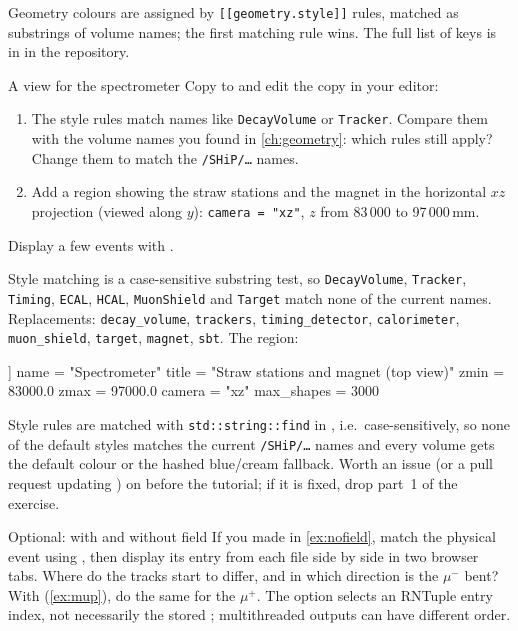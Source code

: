 Geometry colours are assigned by \texttt{[[geometry.style]]} rules, matched
as substrings of volume names; the first matching rule wins. The full list of
keys is in  in the repository.

\begin{exercise}{A view for the spectrometer}
Copy  to  and edit the copy
in your editor:
\begin{enumerate}
  \item The style rules match names like \texttt{DecayVolume} or
        \texttt{Tracker}. Compare them with the volume names you found in
        \cref{ch:geometry}: which rules still apply? Change them to match the
        \texttt{/SHiP/\ldots} names.
  \item Add a region showing the straw stations and the magnet in the
        horizontal $xz$ projection (viewed along $y$): \texttt{camera = "xz"},
        $z$ from 83\,000 to 97\,000\,mm.
\end{enumerate}
Display a few events with .
\end{exercise}

\begin{solution}
Style matching is a case-sensitive substring test, so
\texttt{DecayVolume}, \texttt{Tracker}, \texttt{Timing}, \texttt{ECAL},
\texttt{HCAL}, \texttt{MuonShield} and \texttt{Target} match none of the
current names. Replacements: \texttt{decay\_volume}, \texttt{trackers},
\texttt{timing\_detector}, \texttt{calorimeter}, \texttt{muon\_shield},
\texttt{target}, \texttt{magnet}, \texttt{sbt}. The region:
\begin{tomlcode}
[[region]]
name = "Spectrometer"
title = "Straw stations and magnet (top view)"
zmin = 83000.0
zmax = 97000.0
camera = "xz"
max_shapes = 3000
\end{tomlcode}
\end{solution}

\begin{organisernote}
Style rules are matched with \texttt{std::string::find} in
, i.e.\ case-sensitively, so none of the default
styles matches the current \texttt{/SHiP/\ldots} names and every volume gets
the default colour or the hashed blue/cream fallback. Worth an issue (or a
pull request updating ) on 
before the tutorial; if it is fixed, drop part~1 of the exercise.
\end{organisernote}

\begin{exercise}[colback=white]{Optional: with and without field}
If you made  in \cref{ex:nofield}, match
the physical event using , then display its entry from
each file side by side in two browser tabs. Where do the tracks start to
differ, and in which direction is the $\mu^-$ bent? With
 (\cref{ex:mup}), do the same for the $\mu^+$.
The  option selects an RNTuple entry index, not necessarily the
stored ; multithreaded outputs can have different order.
\end{exercise}
